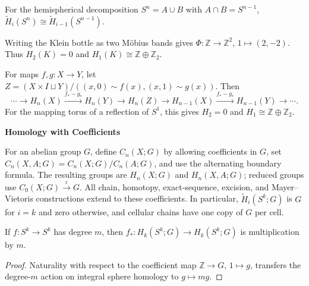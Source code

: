 \begin{example}
\label{ex:mayer-vietoris-sphere}

For the hemispherical decomposition $S^n=A\cup B$ with $A\cap B=S^{n-1}$, $\widetilde H_i(S^n)\cong\widetilde H_{i-1}(S^{n-1})$.
\end{example}

\begin{example}
\label{ex:mayer-vietoris-klein-bottle}

Writing the Klein bottle as two Möbius bands gives $\Phi:\mathbb{Z}\to\mathbb{Z}^2$, $1\mapsto(2,-2)$.  Thus $H_2(K)=0$ and $H_1(K)\cong\mathbb{Z}\oplus\mathbb{Z}_2$.
\end{example}

\begin{example}
\label{ex:homology-mapping-torus}

For maps $f,g:X\to Y$, let $Z=(X\times I\sqcup Y)/((x,0)\sim f(x),(x,1)\sim g(x))$.  Then
\[
\cdots\to H_n(X)\xrightarrow{f_*-g_*}H_n(Y)\to H_n(Z)\to H_{n-1}(X)\xrightarrow{f_*-g_*}H_{n-1}(Y)\to\cdots.
\]
For the mapping torus of a reflection of $S^1$, this gives $H_2=0$ and $H_1\cong\mathbb{Z}\oplus\mathbb{Z}_2$.
\end{example}

\textbf{Homology with Coefficients}

For an abelian group $G$, define $C_n(X;G)$ by allowing coefficients in $G$, set $C_n(X,A;G)=C_n(X;G)/C_n(A;G)$, and use the alternating boundary formula.  The resulting groups are $H_n(X;G)$ and $H_n(X,A;G)$; reduced groups use $C_0(X;G)\xrightarrow{\varepsilon}G$.  All chain, homotopy, exact-sequence, excision, and Mayer--Vietoris constructions extend to these coefficients.  In particular, $\widetilde H_i(S^k;G)$ is $G$ for $i=k$ and zero otherwise, and cellular chains have one copy of $G$ per cell.

\begin{lemma}
\label{lem:homology-map-degree-m-coefficients}

If $f:S^k\to S^k$ has degree $m$, then $f_*:H_k(S^k;G)\to H_k(S^k;G)$ is multiplication by $m$.
\end{lemma}
\begin{proof}
\sketch Naturality with respect to the coefficient map $\mathbb{Z}\to G$, $1\mapsto g$, transfers the degree-$m$ action on integral sphere homology to $g\mapsto mg$.
\end{proof}

